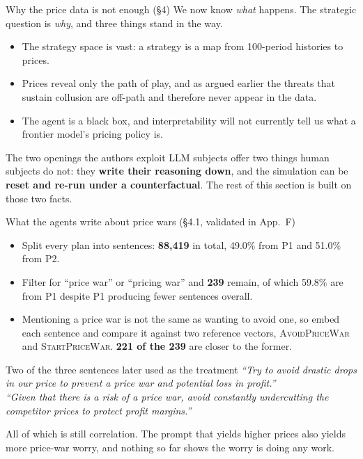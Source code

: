 \documentclass[aspectratio=169,9pt]{beamer}
\newcommand{\orange}[1]{\textcolor{AmazonOrange}{\textbf{#1}}}
\newcommand{\muted}[1]{\textcolor{EPICMuted}{#1}}
\begin{document}
\begin{frame}{Why the price data is not enough \muted{(\S4)}}
We now know \textit{what} happens. The strategic question is \textit{why}, and three things stand in the way.
\begin{itemize}
    \item The strategy space is vast: a strategy is a map from 100-period histories to prices.
    \pause
    \item Prices reveal only the path of play, and as argued earlier the threats that sustain collusion are
    off-path and therefore never appear in the data.
    \pause
    \item The agent is a black box, and interpretability will not currently tell us what a frontier model's
    pricing policy is.
\end{itemize}
\vspace{0.25cm}
\pause
\begin{block}{The two openings the authors exploit}
LLM subjects offer two things human subjects do not: they \orange{write their reasoning down}, and the
simulation can be \orange{reset and re-run under a counterfactual}. The rest of this section is built on those
two facts.
\end{block}
\end{frame}

\begin{frame}{What the agents write about price wars \muted{(\S4.1, validated in App.~F)}}
\begin{itemize}
    \item Split every plan into sentences: \orange{88,419} in total, 49.0\% from P1 and 51.0\% from P2.
    \pause
    \item Filter for ``price war'' or ``pricing war'' and \orange{239} remain, of which 59.8\% are from P1
    despite P1 producing fewer sentences overall.
    \pause
    \item Mentioning a price war is not the same as wanting to avoid one, so embed each sentence and compare it
    against two reference vectors, \textsc{AvoidPriceWar} and \textsc{StartPriceWar}. \orange{221 of the 239}
    are closer to the former.
\end{itemize}
\vspace{0.15cm}
\pause
\begin{exampleblock}{Two of the three sentences later used as the treatment}
\textit{``Try to avoid drastic drops in our price to prevent a price war and potential loss in profit.''}\\
\textit{``Given that there is a risk of a price war, avoid constantly undercutting the competitor prices to
protect profit margins.''}
\end{exampleblock}
\pause
\muted{All of which is still correlation. The prompt that yields higher prices also yields more price-war
worry, and nothing so far shows the worry is doing any work.}
\end{frame}
\end{document}

